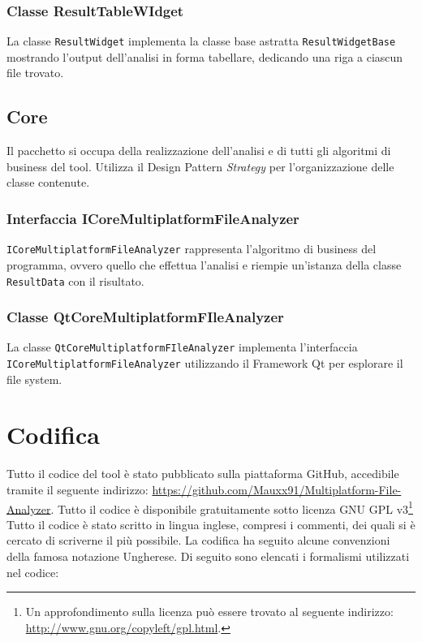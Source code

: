 		\subsubsection{Classe ResultTableWIdget}
			La classe \texttt{ResultWidget} implementa la classe base astratta \texttt{ResultWidgetBase} mostrando l'output dell'analisi in forma tabellare, dedicando una riga a ciascun file trovato.
			
	\subsection{Core}
		Il pacchetto si occupa della realizzazione dell'analisi e di tutti gli algoritmi di business del tool. Utilizza il Design Pattern \textit{Strategy} per l'organizzazione delle classe contenute.
		
		\subsubsection{Interfaccia ICoreMultiplatformFileAnalyzer}
			\texttt{ICoreMultiplatformFileAnalyzer} rappresenta l'algoritmo di business del programma, ovvero quello che effettua l'analisi e riempie un'istanza della classe \texttt{ResultData} con il risultato.
			
		\subsubsection{Classe QtCoreMultiplatformFIleAnalyzer}
			La classe \texttt{QtCoreMultiplatformFIleAnalyzer} implementa l'interfaccia\\ \texttt{ICoreMultiplatformFileAnalyzer} utilizzando il Framework Qt per esplorare il file system.
			
\section{Codifica}
	Tutto il codice del tool è stato pubblicato sulla piattaforma GitHub, accedibile tramite il seguente indirizzo: \url{https://github.com/Mauxx91/Multiplatform-File-Analyzer}. Tutto il codice è disponibile gratuitamente sotto licenza GNU GPL v3\footnote{Un approfondimento sulla licenza può essere trovato al seguente indirizzo: \url{http://www.gnu.org/copyleft/gpl.html}.}\\

	Tutto il codice è stato scritto in lingua inglese, compresi i commenti, dei quali si è cercato di scriverne il più possibile.
	La codifica ha seguito alcune convenzioni della famosa notazione Ungherese. Di seguito sono elencati i formalismi utilizzati nel codice:
	
